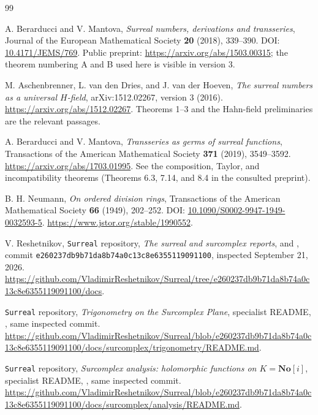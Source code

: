 \documentclass[11pt,a4paper]{article}
\theoremstyle{definition}
\newcommand{\No}{\mathbf{No}}
\numberwithin{equation}{section}
\begin{document}
\begin{thebibliography}{99}

A. Berarducci and V. Mantova,
\emph{Surreal numbers, derivations and transseries},
Journal of the European Mathematical Society \textbf{20} (2018), 339--390.
DOI: \href{https://doi.org/10.4171/JEMS/769}{10.4171/JEMS/769}.
Public preprint: \url{https://arxiv.org/abs/1503.00315}; the theorem
numbering A and B used here is visible in version 3.

M. Aschenbrenner, L. van den Dries, and J. van der Hoeven,
\emph{The surreal numbers as a universal $H$-field},
arXiv:1512.02267, version 3 (2016).
\url{https://arxiv.org/abs/1512.02267}.
Theorems 1--3 and the Hahn-field preliminaries are the relevant passages.

A. Berarducci and V. Mantova,
\emph{Transseries as germs of surreal functions},
Transactions of the American Mathematical Society \textbf{371} (2019),
3549--3592.
\url{https://arxiv.org/abs/1703.01995}.
See the composition, Taylor, and incompatibility theorems (Theorems 6.3,
7.14, and 8.4 in the consulted preprint).

B. H. Neumann,
\emph{On ordered division rings},
Transactions of the American Mathematical Society \textbf{66} (1949),
202--252.
DOI: \href{https://doi.org/10.1090/S0002-9947-1949-0032593-5}
{10.1090/S0002-9947-1949-0032593-5}.
\url{https://www.jstor.org/stable/1990552}.

V. Reshetnikov, \texttt{Surreal} repository,
\emph{The surreal and surcomplex reports},
 and ,
commit \texttt{e260237db9b71da8b74a0c13c8e6355119091100},
inspected September 21, 2026.
\url{https://github.com/VladimirReshetnikov/Surreal/tree/e260237db9b71da8b74a0c13c8e6355119091100/docs}.

\texttt{Surreal} repository,
\emph{Trigonometry on the Surcomplex Plane}, specialist README,
, same inspected commit.
\url{https://github.com/VladimirReshetnikov/Surreal/blob/e260237db9b71da8b74a0c13c8e6355119091100/docs/surcomplex/trigonometry/README.md}.

\texttt{Surreal} repository,
\emph{Surcomplex analysis: holomorphic functions on $K=\No[i]$},
specialist README,
, same inspected commit.
\url{https://github.com/VladimirReshetnikov/Surreal/blob/e260237db9b71da8b74a0c13c8e6355119091100/docs/surcomplex/analysis/README.md}.


\end{thebibliography}
\end{document}
